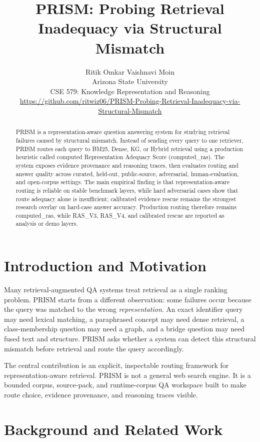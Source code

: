 \documentclass{article}
\title{PRISM: Probing Retrieval Inadequacy via Structural Mismatch}
\author{%
Ritik \quad Omkar \quad Vaishnavi \quad Moin \\
Arizona State University \\
CSE 579: Knowledge Representation and Reasoning \\
\url{https://github.com/ritwiz06/PRISM-Probing-Retrieval-Inadequacy-via-Structural-Mismatch}
}
\begin{document}
\maketitle

\begin{abstract}
PRISM is a representation-aware question answering system for studying retrieval failures caused by structural mismatch. Instead of sending every query to one retriever, PRISM routes each query to BM25, Dense, KG, or Hybrid retrieval using a production heuristic called computed Representation Adequacy Score (computed\_ras). The system exposes evidence provenance and reasoning traces, then evaluates routing and answer quality across curated, held-out, public-source, adversarial, human-evaluation, and open-corpus settings. The main empirical finding is that representation-aware routing is reliable on stable benchmark layers, while hard adversarial cases show that route adequacy alone is insufficient; calibrated evidence rescue remains the strongest research overlay on hard-case answer accuracy. Production routing therefore remains computed\_ras, while RAS\_V3, RAS\_V4, and calibrated rescue are reported as analysis or demo layers.
\end{abstract}

\section{Introduction and Motivation}

Many retrieval-augmented QA systems treat retrieval as a single ranking problem. PRISM starts from a different observation: some failures occur because the query was matched to the wrong \emph{representation}. An exact identifier query may need lexical matching, a paraphrased concept may need dense retrieval, a class-membership question may need a graph, and a bridge question may need fused text and structure. PRISM asks whether a system can detect this structural mismatch before retrieval and route the query accordingly.

The central contribution is an explicit, inspectable routing framework for representation-aware retrieval. PRISM is not a general web search engine. It is a bounded corpus, source-pack, and runtime-corpus QA workspace built to make route choice, evidence provenance, and reasoning traces visible.

\section{Background and Related Work}
\end{document}
